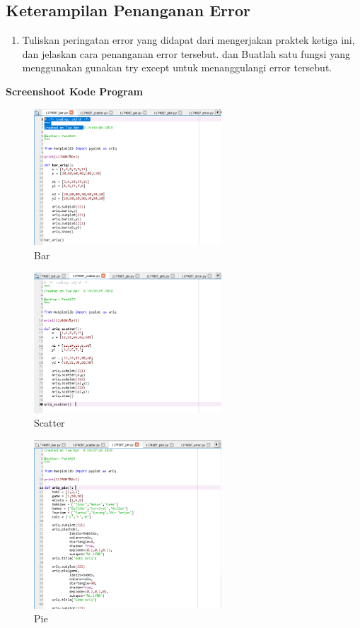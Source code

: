 \subsection{Keterampilan Penanganan Error}
\begin{enumerate}
\item Tuliskan peringatan error yang didapat dari mengerjakan praktek ketiga ini, dan jelaskan cara penanganan error tersebut. dan Buatlah satu fungsi yang menggunakan gunakan try except untuk menanggulangi error tersebut.

	

\end{enumerate}

\textbf{Screenshoot Kode Program}
\begin{figure}[ht]	
    \includegraphics[width=7cm]{figures/6/1174087/Praktek/1174087_bar.png}
    \centering
    \caption{Bar}
\end{figure}

\begin{figure}[ht]	
    \includegraphics[width=7cm]{figures/6/1174087/Praktek/1174087_scatter.png}
    \centering
    \caption{Scatter}
\end{figure}

\begin{figure}[ht]	
    \includegraphics[width=7cm]{figures/6/1174087/Praktek/1174087_pie.png}
    \centering
    \caption{Pie}
\end{figure}

